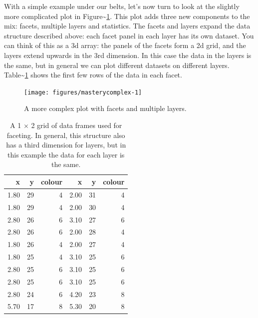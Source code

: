 
With a simple example under our belts, let's now turn to look at the
slightly more complicated plot in
Figure\textasciitilde{}\ref{fig:complex}. This plot adds three new
components to the mix: facets, multiple layers and statistics. The
facets and layers expand the data structure described above: each facet
panel in each layer has its own dataset. You can think of this as a 3d
array: the panels of the facets form a 2d grid, and the layers extend
upwards in the 3rd dimension. In this case the data in the layers is the
same, but in general we can plot different datasets on different layers.
Table\textasciitilde{}\ref{tbl:data-complex} shows the first few rows of
the data in each facet.

\begin{Shaded}
\begin{Highlighting}[]
 \StringTok{ }\StringTok{ }\NormalTok{()}
\end{Highlighting}
\end{Shaded}

\begin{figure}
\texttt{[image: figures/masterycomplex-1]} \caption{A more complex plot with facets and multiple layers.\label{fig:complex}}
\end{figure}

\begin{table}[ht]
\centering
\begin{tabular}{rrrrrr}
  \hline
x & y & colour & x & y & colour \\ 
  \hline
1.80 &  29 &   4 & 2.00 &  31 &   4 \\ 
  1.80 &  29 &   4 & 2.00 &  30 &   4 \\ 
  2.80 &  26 &   6 & 3.10 &  27 &   6 \\ 
  2.80 &  26 &   6 & 2.00 &  28 &   4 \\ 
  1.80 &  26 &   4 & 2.00 &  27 &   4 \\ 
  1.80 &  25 &   4 & 3.10 &  25 &   6 \\ 
  2.80 &  25 &   6 & 3.10 &  25 &   6 \\ 
  2.80 &  25 &   6 & 3.10 &  25 &   6 \\ 
  2.80 &  24 &   6 & 4.20 &  23 &   8 \\ 
  5.70 &  17 &   8 & 5.30 &  20 &   8 \\ 
   \hline
\end{tabular}
\caption{A 1 $\times$ 2 grid of data frames used for faceting.  In general, this structure also has a third dimension for layers, but in this example the data for each layer is the same.} 
\label{tbl:data-complex}
\end{table}


